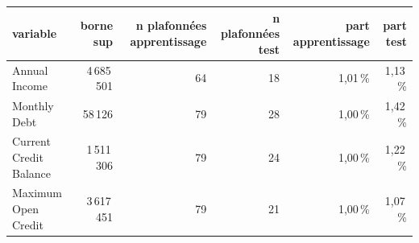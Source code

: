 \begin{tabular}{lrrrrr}
\toprule
\textbf{variable} & \textbf{borne sup} & \textbf{n plafonnées apprentissage} & \textbf{n plafonnées test} & \textbf{part apprentissage} & \textbf{part test} \\
\midrule
Annual Income & 4\,685\,501 & 64 & 18 & 1,01\,\% & 1,13\,\% \\
Monthly Debt & 58\,126 & 79 & 28 & 1,00\,\% & 1,42\,\% \\
Current Credit Balance & 1\,511\,306 & 79 & 24 & 1,00\,\% & 1,22\,\% \\
Maximum Open Credit & 3\,617\,451 & 79 & 21 & 1,00\,\% & 1,07\,\% \\
\bottomrule
\end{tabular}
